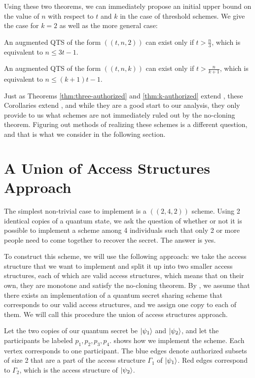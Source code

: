 Using these two theorems, we can immediately propose an initial upper bound on the value of $n$ with respect to $t$ and $k$ in the case of threshold schemes. We give the case for $k=2$ as well as the more general case:

\begin{corollary}
	\label{cor:qts2}
	An augmented QTS of the form $((t,n, 2))$ can exist only if $t > \frac{n}{3}$, which is equivalent to $n \leq 3t-1$.
\end{corollary}

\begin{corollary}
	\label{cor:qtsk}
	An augmented QTS of the form $((t,n, k))$ can exist only if $t > \frac{n}{k+1}$, which is equivalent to $n \leq (k+1)t-1$.
\end{corollary}

Just as Theorems \ref{thm:three-authorized} and \ref{thm:k-authorized} extend , these Corollaries extend , and while they are a good start to our analysis, they only provide to us what schemes are not immediately ruled out by the no-cloning theorem. Figuring out methods of realizing these schemes is a different question, and that is what we consider in the following section.

\section{A Union of Access Structures Approach}
\label{sec:union-access-structures}

The simplest non-trivial case to implement is a $((2,4,2))$ scheme. Using 2 identical copies of a quantum state, we ask the question of whether or not it is possible to implement a scheme among 4 individuals such that only 2 or more people need to come together to recover the secret. The answer is yes.

To construct this scheme, we will use the following approach: we take the access structure that we want to implement and split it up into two smaller access structures, each of which are valid access structures, which means that on their own, they are monotone and satisfy the no-cloning theorem. By , we assume that there exists an implementation of a quantum secret sharing scheme that corresponds to our valid access structures, and we assign one copy to each of them. We will call this procedure the union of access structures approach.

Let the two copies of our quantum secret be $\ket{\psi_1}$ and $\ket{\psi_2}$, and let the participants be labeled $p_1, p_2, p_3, p_4$.  shows how we implement the scheme. Each vertex corresponds to one participant. The blue edges denote authorized subsets of size 2 that are a part of the access structure $\Gamma_1$ of $\ket{\psi_1}$. Red edges correspond to $\Gamma_2$, which is the access structure of $\ket{\psi_2}$.



